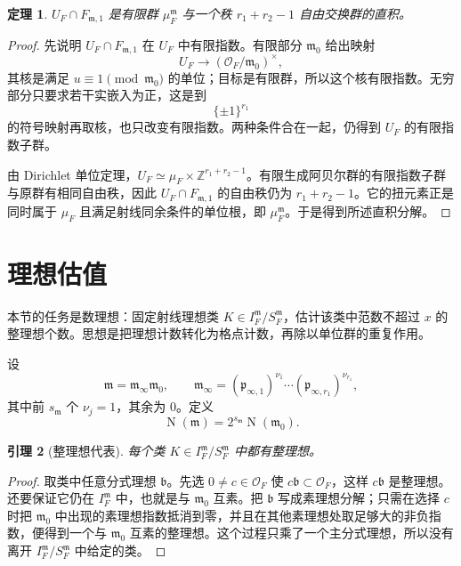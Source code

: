 \documentclass[11pt,a4paper,openany]{ctexbook}
\numberwithin{equation}{chapter}
\newcommand{\Z}{\mathbb{Z}}
\newcommand{\OF}{\mathcal{O}_F}
\newcommand{\Nm}{\operatorname{N}}
\theoremstyle{plain}
\newtheorem{theorem}{定理}[chapter]
\newtheorem{lemma}[theorem]{引理}
\theoremstyle{definition}
\theoremstyle{remark}
\begin{document}
\begin{theorem}
$U_F\cap F_{\mathfrak m,1}$ 是有限群 $\mu_F^{\mathfrak m}$ 与一个秩 $r_1+r_2-1$ 自由交换群的直积。
\end{theorem}

\begin{proof}
先说明 $U_F\cap F_{\mathfrak m,1}$ 在 $U_F$ 中有限指数。有限部分
$\mathfrak m_0$ 给出映射
\[
U_F\longrightarrow(\OF/\mathfrak m_0)^\times,
\]
其核是满足 $u\equiv1\pmod{\mathfrak m_0}$ 的单位；目标是有限群，所以这个核有限指数。无穷部分只要求若干实嵌入为正，这是到
\[
\{\pm1\}^{r_1}
\]
的符号映射再取核，也只改变有限指数。两种条件合在一起，仍得到
$U_F$ 的有限指数子群。

由 Dirichlet 单位定理，$U_F\simeq\mu_F\times\Z^{r_1+r_2-1}$。有限生成阿贝尔群的有限指数子群与原群有相同自由秩，因此
$U_F\cap F_{\mathfrak m,1}$ 的自由秩仍为 $r_1+r_2-1$。它的扭元素正是同时属于
$\mu_F$ 且满足射线同余条件的单位根，即 $\mu_F^{\mathfrak m}$。于是得到所述直积分解。
\end{proof}

\section{理想估值}

本节的任务是数理想：固定射线理想类 $K\in I_F^{\mathfrak m}/S_F^{\mathfrak m}$，估计该类中范数不超过 $x$ 的整理想个数。思想是把理想计数转化为格点计数，再除以单位群的重复作用。

设
\[
\mathfrak m=\mathfrak m_\infty\mathfrak m_0,\qquad
\mathfrak m_\infty=(\mathfrak p_{\infty,1})^{\nu_1}\cdots
(\mathfrak p_{\infty,r_1})^{\nu_{r_1}},
\]
其中前 $s_{\mathfrak m}$ 个 $\nu_j=1$，其余为 $0$。定义
\[
\Nm(\mathfrak m)=2^{s_{\mathfrak m}}\Nm(\mathfrak m_0).
\]

\begin{lemma}[整理想代表]
每个类 $K\in I_F^{\mathfrak m}/S_F^{\mathfrak m}$ 中都有整理想。
\end{lemma}

\begin{proof}
取类中任意分式理想 $\mathfrak b$。先选 $0\ne c\in\OF$ 使
$c\mathfrak b\subset\OF$，这样 $c\mathfrak b$ 是整理想。还要保证它仍在
$I_F^{\mathfrak m}$ 中，也就是与 $\mathfrak m_0$ 互素。把
$\mathfrak b$ 写成素理想分解；只需在选择 $c$ 时把 $\mathfrak m_0$ 中出现的素理想指数抵消到零，并且在其他素理想处取足够大的非负指数，便得到一个与
$\mathfrak m_0$ 互素的整理想。这个过程只乘了一个主分式理想，所以没有离开
$I_F^{\mathfrak m}/S_F^{\mathfrak m}$ 中给定的类。
\end{proof}
\end{document}
